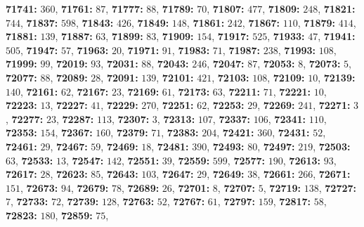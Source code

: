 \textsf{\bfseries 71741:} $360$, \textsf{\bfseries 71761:} $87$, \textsf{\bfseries 71777:} $88$, \textsf{\bfseries 71789:} $70$, \textsf{\bfseries 71807:} $477$, \textsf{\bfseries 71809:} $248$, \textsf{\bfseries 71821:} $744$, \textsf{\bfseries 71837:} $598$, \textsf{\bfseries 71843:} $426$, \textsf{\bfseries 71849:} $148$, \textsf{\bfseries 71861:} $242$, \textsf{\bfseries 71867:} $110$, \textsf{\bfseries 71879:} $414$, \textsf{\bfseries 71881:} $139$, \textsf{\bfseries 71887:} $63$, \textsf{\bfseries 71899:} $83$, \textsf{\bfseries 71909:} $154$, \textsf{\bfseries 71917:} $525$, \textsf{\bfseries 71933:} $47$, \textsf{\bfseries 71941:} $505$, \textsf{\bfseries 71947:} $57$, \textsf{\bfseries 71963:} $20$, \textsf{\bfseries 71971:} $91$, \textsf{\bfseries 71983:} $71$, \textsf{\bfseries 71987:} $238$, \textsf{\bfseries 71993:} $108$, \textsf{\bfseries 71999:} $99$, \textsf{\bfseries 72019:} $93$, \textsf{\bfseries 72031:} $88$, \textsf{\bfseries 72043:} $246$, \textsf{\bfseries 72047:} $87$, \textsf{\bfseries 72053:} $8$, \textsf{\bfseries 72073:} $5$, \textsf{\bfseries 72077:} $88$, \textsf{\bfseries 72089:} $28$, \textsf{\bfseries 72091:} $139$, \textsf{\bfseries 72101:} $421$, \textsf{\bfseries 72103:} $108$, \textsf{\bfseries 72109:} $10$, \textsf{\bfseries 72139:} $140$, \textsf{\bfseries 72161:} $62$, \textsf{\bfseries 72167:} $23$, \textsf{\bfseries 72169:} $61$, \textsf{\bfseries 72173:} $63$, \textsf{\bfseries 72211:} $71$, \textsf{\bfseries 72221:} $10$, \textsf{\bfseries 72223:} $13$, \textsf{\bfseries 72227:} $41$, \textsf{\bfseries 72229:} $270$, \textsf{\bfseries 72251:} $62$, \textsf{\bfseries 72253:} $29$, \textsf{\bfseries 72269:} $241$, \textsf{\bfseries 72271:} $3$, \textsf{\bfseries 72277:} $23$, \textsf{\bfseries 72287:} $113$, \textsf{\bfseries 72307:} $3$, \textsf{\bfseries 72313:} $107$, \textsf{\bfseries 72337:} $106$, \textsf{\bfseries 72341:} $110$, \textsf{\bfseries 72353:} $154$, \textsf{\bfseries 72367:} $160$, \textsf{\bfseries 72379:} $71$, \textsf{\bfseries 72383:} $204$, \textsf{\bfseries 72421:} $360$, \textsf{\bfseries 72431:} $52$, \textsf{\bfseries 72461:} $29$, \textsf{\bfseries 72467:} $59$, \textsf{\bfseries 72469:} $18$, \textsf{\bfseries 72481:} $390$, \textsf{\bfseries 72493:} $80$, \textsf{\bfseries 72497:} $219$, \textsf{\bfseries 72503:} $63$, \textsf{\bfseries 72533:} $13$, \textsf{\bfseries 72547:} $142$, \textsf{\bfseries 72551:} $39$, \textsf{\bfseries 72559:} $599$, \textsf{\bfseries 72577:} $190$, \textsf{\bfseries 72613:} $93$, \textsf{\bfseries 72617:} $28$, \textsf{\bfseries 72623:} $85$, \textsf{\bfseries 72643:} $103$, \textsf{\bfseries 72647:} $29$, \textsf{\bfseries 72649:} $38$, \textsf{\bfseries 72661:} $266$, \textsf{\bfseries 72671:} $151$, \textsf{\bfseries 72673:} $94$, \textsf{\bfseries 72679:} $78$, \textsf{\bfseries 72689:} $26$, \textsf{\bfseries 72701:} $8$, \textsf{\bfseries 72707:} $5$, \textsf{\bfseries 72719:} $138$, \textsf{\bfseries 72727:} $7$, \textsf{\bfseries 72733:} $72$, \textsf{\bfseries 72739:} $128$, \textsf{\bfseries 72763:} $52$, \textsf{\bfseries 72767:} $61$, \textsf{\bfseries 72797:} $159$, \textsf{\bfseries 72817:} $58$, \textsf{\bfseries 72823:} $180$, \textsf{\bfseries 72859:} $75$, 

